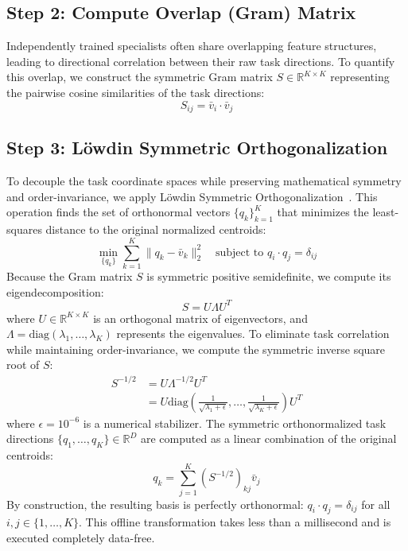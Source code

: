 \subsection{Step 2: Compute Overlap (Gram) Matrix}
Independently trained specialists often share overlapping feature structures, leading to directional correlation between their raw task directions. To quantify this overlap, we construct the symmetric Gram matrix $S \in \mathbb{R}^{K \times K}$ representing the pairwise cosine similarities of the task directions:
\begin{equation}
S_{ij} = \bar{v}_i \cdot \bar{v}_j
\end{equation}

\subsection{Step 3: L{\"o}wdin Symmetric Orthogonalization}
To decouple the task coordinate spaces while preserving mathematical symmetry and order-invariance, we apply L{\"o}wdin Symmetric Orthogonalization~\cite{lowdin1950non}. This operation finds the set of orthonormal vectors $\{q_k\}_{k=1}^K$ that minimizes the least-squares distance to the original normalized centroids:
\begin{equation}
\min_{\{q_k\}} \sum_{k=1}^K \|q_k - \bar{v}_k\|_2^2 \quad \text{subject to } q_i \cdot q_j = \delta_{ij}
\end{equation}
Because the Gram matrix $S$ is symmetric positive semidefinite, we compute its eigendecomposition:
\begin{equation}
S = U \Lambda U^T
\end{equation}
where $U \in \mathbb{R}^{K \times K}$ is an orthogonal matrix of eigenvectors, and $\Lambda = \text{diag}(\lambda_1, \dots, \lambda_K)$ represents the eigenvalues. To eliminate task correlation while maintaining order-invariance, we compute the symmetric inverse square root of $S$:
\begin{equation}
\begin{aligned}
S^{-1/2} &= U \Lambda^{-1/2} U^T \\
&= U \text{diag}\left(\frac{1}{\sqrt{\lambda_1 + \epsilon}}, \dots, \frac{1}{\sqrt{\lambda_K + \epsilon}}\right) U^T
\end{aligned}
\end{equation}
where $\epsilon = 10^{-6}$ is a numerical stabilizer. The symmetric orthonormalized task directions $\{q_1, \dots, q_K\} \in \mathbb{R}^D$ are computed as a linear combination of the original centroids:
\begin{equation}
q_k = \sum_{j=1}^K (S^{-1/2})_{kj} \bar{v}_j
\end{equation}
By construction, the resulting basis is perfectly orthonormal: $q_i \cdot q_j = \delta_{ij}$ for all $i, j \in \{1, \dots, K\}$. This offline transformation takes less than a millisecond and is executed completely data-free.

